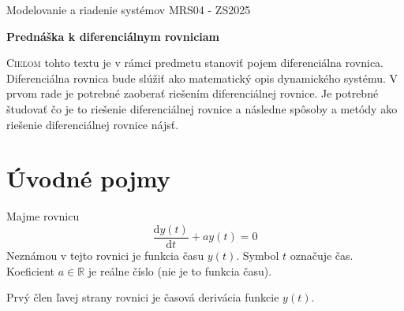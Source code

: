 \documentclass[a4paper, 10pt, ]{article}
\def\oznacenieCasti{MRS04 - ZS2025}
\begin{document}
\lstset{%
style=mystyle,
rangebeginprefix=\#\#\#\ cellB\ ,%
rangebeginsuffix=\ \#\#\#,%
rangeendprefix=\#\#\#\ cellE\ ,%
rangeendsuffix=\ \#\#\#,%
includerangemarker=false,
}





\fontsize{12pt}{22pt}\selectfont

\centerline{\textsf{Modelovanie a riadenie systémov} \hfill \textsf{\oznacenieCasti}}

\fontsize{18pt}{22pt}\selectfont





\begin{flushleft}
	\textbf{\textsf{Prednáška k diferenciálnym rovniciam}}
\end{flushleft}





\normalsize

\bigskip

{\hypersetup{hidelinks}

\tableofcontents

}

\bigskip

\vspace{18pt}



\noindent
\lettrine[lines=3, nindent=0pt]{C}{ieľom} tohto textu je v rámci predmetu stanoviť pojem diferenciálna rovnica. Diferenciálna rovnica bude slúžiť ako matematický opis dynamického systému. V prvom rade je potrebné zaoberať riešením diferenciálnej rovnice. Je potrebné študovať čo je to riešenie diferenciálnej rovnice a následne spôsoby a metódy ako riešenie diferenciálnej rovnice nájsť.





\section{Úvodné pojmy}

Majme rovnicu
\begin{equation} \label{eq:1}
    \frac{\text{d}y(t)}{\text{d}t} + a y(t) = 0
\end{equation}
Neznámou v tejto rovnici je funkcia času $y(t)$. Symbol $t$ označuje čas. Koeficient $a \in \mathbb R$ je reálne číslo (nie je to funkcia času). 

Prvý člen ľavej strany rovnici je časová derivácia funkcie $y(t)$. 
\end{document}
